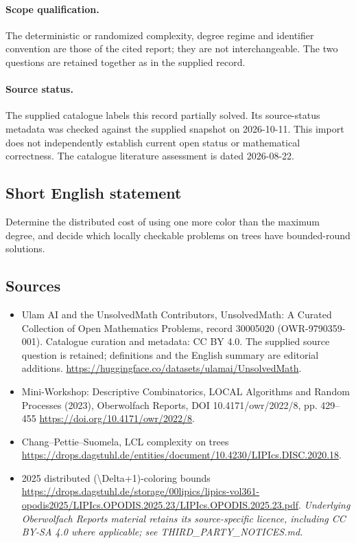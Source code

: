 \documentclass[11pt]{article}
\begin{document}
\paragraph{Scope qualification.}
The deterministic or randomized complexity, degree regime and identifier convention are those of the cited report; they are not interchangeable. The two questions are retained together as in the supplied record.
\paragraph{Source status.}
The supplied catalogue labels this record partially solved. Its source-status metadata was checked against the supplied snapshot on 2026-10-11. This import does not independently establish current open status or mathematical correctness. The catalogue literature assessment is dated 2026-08-22.
\subsection{Short English statement}
Determine the distributed cost of using one more color than the maximum degree, and decide which locally checkable problems on trees have bounded-round solutions.
\subsection{Sources}
\begin{itemize}
\item[S1] Ulam AI and the UnsolvedMath Contributors, UnsolvedMath: A Curated Collection of Open Mathematics Problems, record 30005020 (OWR-9790359-001). Catalogue curation and metadata: CC BY 4.0. The supplied source question is retained; definitions and the English summary are editorial additions.
\url{https://huggingface.co/datasets/ulamai/UnsolvedMath}.
\item[S2] Mini-Workshop: Descriptive Combinatorics, LOCAL Algorithms and Random Processes (2023), Oberwolfach Reports, DOI 10.4171/owr/2022/8, pp. 429--455
\url{https://doi.org/10.4171/owr/2022/8}.
\item[S3] Chang--Pettie--Suomela, LCL complexity on trees
\url{https://drops.dagstuhl.de/entities/document/10.4230/LIPIcs.DISC.2020.18}.
\item[S4] 2025 distributed (\textbackslash{}Delta+1)-coloring bounds
\url{https://drops.dagstuhl.de/storage/00lipics/lipics-vol361-opodis2025/LIPIcs.OPODIS.2025.23/LIPIcs.OPODIS.2025.23.pdf}.
\textit{Underlying Oberwolfach Reports material retains its source-specific licence, including CC BY-SA 4.0 where applicable; see THIRD\_PARTY\_NOTICES.md.}
\end{itemize}
\end{document}
